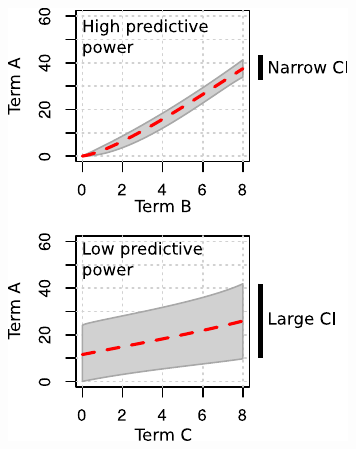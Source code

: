 \documentclass[aspectratio=169, 9pt]{beamer}
\begin{document}
\begin{frame}[c]
\begin{minipage}[t]{.48\linewidth}
\begin{figure}
{		\includegraphics[width=.75\linewidth]{conditional-example.pdf}
	}
	\end{figure}
	\end{minipage}


\end{frame}
\end{document}
